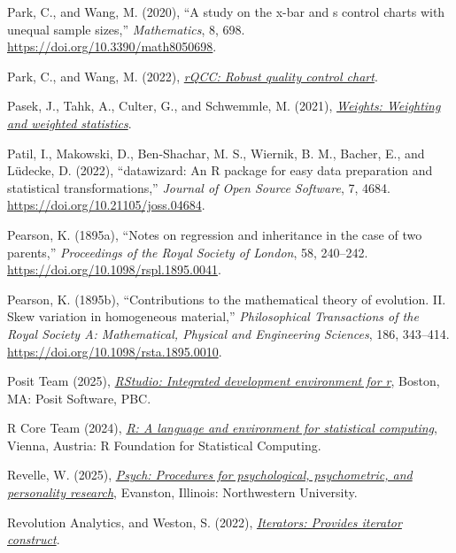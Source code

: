 \documentclass[
  10pt,
  a4paper,
  twoside]{article}
\newlength{\cslhangindent}
\newenvironment{CSLReferences}[2] %
 {\begin{list}{}{%
  \setlength{\itemindent}{0pt}
  \setlength{\leftmargin}{0pt}
  \setlength{\parsep}{0pt}
  \ifodd #1
   \setlength{\leftmargin}{\cslhangindent}
   \setlength{\itemindent}{-1\cslhangindent}
  \fi
  \setlength{\itemsep}{#2\baselineskip}}}
 {\end{list}}
\begin{document}
\begin{CSLReferences}{1}{0}
Park, C., and Wang, M. (2020), {``A study on the x-bar and s control charts with unequal sample sizes,''} \emph{Mathematics}, 8, 698. \url{https://doi.org/10.3390/math8050698}.

Park, C., and Wang, M. (2022), \emph{\href{https://CRAN.R-project.org/package=rQCC}{rQCC: Robust quality control chart}}.

Pasek, J., Tahk, A., Culter, G., and Schwemmle, M. (2021), \emph{\href{https://CRAN.R-project.org/package=weights}{Weights: Weighting and weighted statistics}}.

Patil, I., Makowski, D., Ben-Shachar, M. S., Wiernik, B. M., Bacher, E., and Lüdecke, D. (2022), {``{datawizard}: An {R} package for easy data preparation and statistical transformations,''} \emph{Journal of Open Source Software}, 7, 4684. \url{https://doi.org/10.21105/joss.04684}.

Pearson, K. (1895a), {``Notes on regression and inheritance in the case of two parents,''} \emph{Proceedings of the Royal Society of London}, 58, 240--242. \url{https://doi.org/10.1098/rspl.1895.0041}.

Pearson, K. (1895b), {``Contributions to the mathematical theory of evolution. II. Skew variation in homogeneous material,''} \emph{Philosophical Transactions of the Royal Society A: Mathematical, Physical and Engineering Sciences}, 186, 343--414. \url{https://doi.org/10.1098/rsta.1895.0010}.

Posit Team (2025), \emph{\href{http://www.posit.co/}{RStudio: Integrated development environment for r}}, Boston, MA: Posit Software, PBC.

R Core Team (2024), \emph{\href{https://www.R-project.org/}{R: A language and environment for statistical computing}}, Vienna, Austria: R Foundation for Statistical Computing.

Revelle, W. (2025), \emph{\href{https://CRAN.R-project.org/package=psych}{Psych: Procedures for psychological, psychometric, and personality research}}, Evanston, Illinois: Northwestern University.

Revolution Analytics, and Weston, S. (2022), \emph{\href{https://CRAN.R-project.org/package=iterators}{Iterators: Provides iterator construct}}.


\end{CSLReferences}
\end{document}
